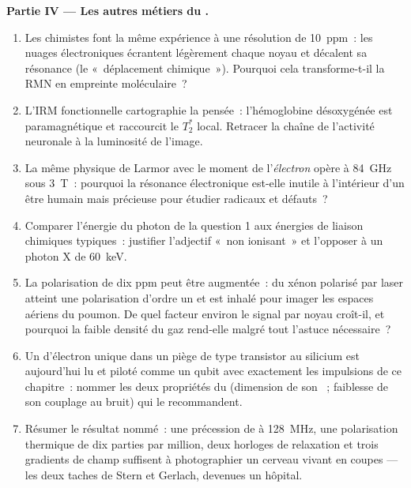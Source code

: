 \begin{problem}
\medskip\noindent\textbf{Partie IV --- Les autres métiers du .}
\begin{enumerate}[resume]
  \item Les chimistes font la même expérience à une résolution de
        \qty{10}{ppm}~: les nuages électroniques écrantent légèrement
        chaque noyau et décalent sa résonance (le «~déplacement
        chimique~»). Pourquoi cela transforme-t-il la RMN en
        empreinte moléculaire~?
  \item L'IRM fonctionnelle cartographie la pensée~: l'hémoglobine
        désoxygénée est paramagnétique et raccourcit le $T_2^*$
        local. Retracer la chaîne de l'activité neuronale à la
        luminosité de l'image.
  \item La même physique de Larmor avec le moment de l'\emph{électron}
        opère à \qty{84}{GHz} sous \qty{3}{T}~: pourquoi la résonance
        électronique est-elle inutile à l'intérieur d'un être humain
        mais précieuse pour étudier radicaux et défauts~?
  \item Comparer l'énergie du photon de la question 1 aux énergies de
        liaison chimiques typiques~: justifier l'adjectif
        «~non ionisant~» et l'opposer à un photon X de \qty{60}{keV}.
  \item La polarisation de dix ppm peut être augmentée~: du xénon
        polarisé par laser atteint une polarisation d'ordre un et est
        inhalé pour imager les espaces aériens du poumon. De quel
        facteur environ le signal par noyau croît-il, et pourquoi la
        faible densité du gaz rend-elle malgré tout l'astuce
        nécessaire~?
  \item Un  d'électron unique dans un piège de type transistor au
        silicium est aujourd'hui lu et piloté comme un qubit avec
        exactement les impulsions de ce chapitre~: nommer les deux
        propriétés du  (dimension de son ~;
        faiblesse de son couplage au bruit) qui le recommandent.
  \item Résumer le résultat nommé~: une précession de  à
        \qty{128}{MHz}, une polarisation thermique de dix parties par
        million, deux horloges de relaxation et trois gradients de
        champ suffisent à photographier un cerveau vivant en coupes
        --- les deux taches de Stern et Gerlach, devenues un hôpital.
\end{enumerate}
\end{problem}
